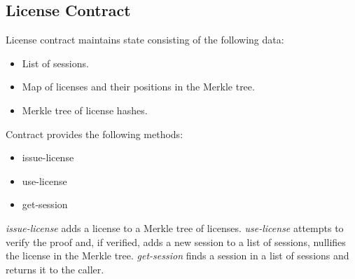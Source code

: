 \subsection{License Contract}

License contract maintains state consisting of the following data:

\begin{itemize}%
	\item List of sessions.
	\item Map of licenses and their positions in the Merkle tree.
	\item Merkle tree of license hashes.
\end{itemize}


Contract provides the following methods:

\begin{itemize}%
	\item issue-license
	\item use-license
	\item get-session
\end{itemize}


\textit{issue-license} adds a license to a Merkle tree of licenses. \textit{use-license} attempts to verify the proof and, if verified, adds a new session to a list of sessions, nullifies the license in the Merkle tree. \textit{get-session} finds a session in a list of sessions and returns it to the caller.


